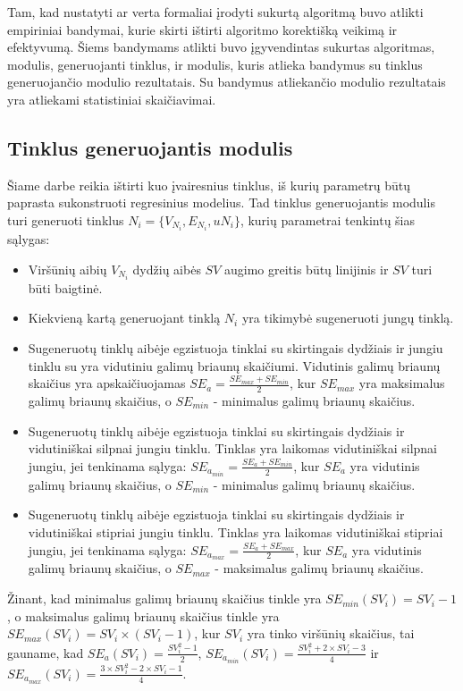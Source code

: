 Tam, kad nustatyti ar verta formaliai įrodyti sukurtą algoritmą buvo atlikti empiriniai bandymai, kurie skirti ištirti algoritmo korektišką veikimą ir efektyvumą. Šiems bandymams atlikti buvo įgyvendintas sukurtas algoritmas, modulis, generuojanti tinklus, ir modulis, kuris atlieka bandymus su tinklus generuojančio modulio rezultatais. Su bandymus atliekančio modulio rezultatais yra atliekami statistiniai skaičiavimai.

\subsection{Tinklus generuojantis modulis}

Šiame darbe reikia ištirti kuo įvairesnius tinklus, iš kurių parametrų būtų paprasta sukonstruoti regresinius modelius. Tad tinklus generuojantis modulis turi generuoti tinklus $N_i = \{V_{N_i}, E_{N_i}, u{N_i}\}$, kurių parametrai tenkintų šias sąlygas:
\begin{itemize}
	\item Viršūnių aibių  $V_{N_i}$ dydžių aibės $SV$ augimo greitis būtų linijinis ir $SV$ turi būti baigtinė.
	\item Kiekvieną kartą generuojant tinklą $N_i$ yra tikimybė sugeneruoti jungų tinklą.
	\item Sugeneruotų tinklų aibėje egzistuoja tinklai su skirtingais dydžiais ir jungiu tinklu su  yra vidutiniu galimų briaunų skaičiumi. Vidutinis galimų briaunų skaičius yra apskaičiuojamas $SE_a = \frac{SE_{max} + SE_{min}}{2}$, kur  $SE_{max}$ yra maksimalus galimų briaunų skaičius, o $SE_{min}$ - minimalus galimų briaunų skaičius.
	\item Sugeneruotų tinklų aibėje egzistuoja tinklai su skirtingais dydžiais ir vidutiniškai silpnai jungiu tinklu. Tinklas yra laikomas vidutiniškai silpnai jungiu, jei tenkinama sąlyga: $SE_{a_{min}} = \frac{SE_a + SE_{min}}{2}$, kur $SE_a$ yra vidutinis galimų briaunų skaičius, o $SE_{min}$ - minimalus galimų briaunų skaičius.
	\item Sugeneruotų tinklų aibėje egzistuoja tinklai su skirtingais dydžiais ir vidutiniškai stipriai jungiu tinklu. Tinklas yra laikomas vidutiniškai stipriai jungiu, jei tenkinama sąlyga: $SE_{a_{max}} = \frac{SE_a + SE_{max}}{2}$, kur $SE_a$ yra vidutinis galimų briaunų skaičius, o $SE_{max}$ - maksimalus galimų briaunų skaičius.
\end{itemize}
Žinant, kad minimalus galimų briaunų skaičius tinkle yra $SE_{min}(SV_i)  = SV_i - 1$, o maksimalus galimų briaunų skaičius tinkle yra $SE_{max}(SV_i) = SV_i \times (SV_i - 1)$, kur $SV_i$ yra tinko viršūnių skaičius, tai gauname, kad  $SE_{a}(SV_i) =\frac{SV_i^2 - 1}{2}$, $SE_{a_{min}}(SV_i)  = \frac{SV_i^2 + 2 \times SV_i - 3}{4}$ ir $SE_{a_{max}}(SV_i) = \frac{3 \times SV_i^2 - 2 \times SV_i - 1}{4}$.


